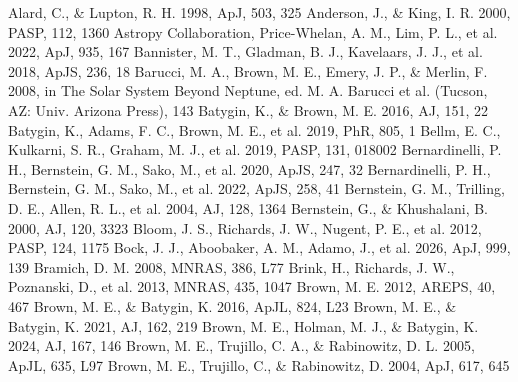 \documentclass[twocolumn,linenumbers,anonymous]{aastex702}
\begin{document}
\begin{thebibliography}{}
 Alard, C., \& Lupton, R. H. 1998, ApJ, 503, 325
 Anderson, J., \& King, I. R. 2000, PASP, 112, 1360
 Astropy Collaboration, Price-Whelan, A. M., Lim, P. L., et al. 2022, ApJ, 935, 167
 Bannister, M. T., Gladman, B. J., Kavelaars, J. J., et al. 2018, ApJS, 236, 18
 Barucci, M. A., Brown, M. E., Emery, J. P., \& Merlin, F. 2008, in The Solar System Beyond Neptune, ed. M. A. Barucci et al. (Tucson, AZ: Univ. Arizona Press), 143
 Batygin, K., \& Brown, M. E. 2016, AJ, 151, 22
 Batygin, K., Adams, F. C., Brown, M. E., et al. 2019, PhR, 805, 1
 Bellm, E. C., Kulkarni, S. R., Graham, M. J., et al. 2019, PASP, 131, 018002
 Bernardinelli, P. H., Bernstein, G. M., Sako, M., et al. 2020, ApJS, 247, 32
 Bernardinelli, P. H., Bernstein, G. M., Sako, M., et al. 2022, ApJS, 258, 41
 Bernstein, G. M., Trilling, D. E., Allen, R. L., et al. 2004, AJ, 128, 1364
 Bernstein, G., \& Khushalani, B. 2000, AJ, 120, 3323
 Bloom, J. S., Richards, J. W., Nugent, P. E., et al. 2012, PASP, 124, 1175
 Bock, J. J., Aboobaker, A. M., Adamo, J., et al. 2026, ApJ, 999, 139
 Bramich, D. M. 2008, MNRAS, 386, L77
 Brink, H., Richards, J. W., Poznanski, D., et al. 2013, MNRAS, 435, 1047
 Brown, M. E. 2012, AREPS, 40, 467
 Brown, M. E., \& Batygin, K. 2016, ApJL, 824, L23
 Brown, M. E., \& Batygin, K. 2021, AJ, 162, 219
 Brown, M. E., Holman, M. J., \& Batygin, K. 2024, AJ, 167, 146
 Brown, M. E., Trujillo, C. A., \& Rabinowitz, D. L. 2005, ApJL, 635, L97
 Brown, M. E., Trujillo, C., \& Rabinowitz, D. 2004, ApJ, 617, 645

\end{thebibliography}
\end{document}
